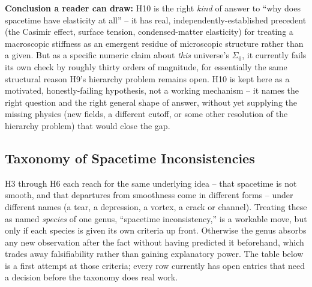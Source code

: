 \documentclass[12pt, a4paper]{article}
\begin{document}
\textbf{Conclusion a reader can draw:} H10 is the right \emph{kind} of
answer to ``why does spacetime have elasticity at all'' -- it has
real, independently-established precedent (the Casimir effect,
surface tension, condensed-matter elasticity) for treating a
macroscopic stiffness as an emergent residue of microscopic structure
rather than a given. But as a specific numeric claim about \emph{this}
universe's $\Sigma_0$, it currently fails its own check by roughly
thirty orders of magnitude, for essentially the same structural reason
H9's hierarchy problem remains open. H10 is kept here as a motivated,
honestly-failing hypothesis, not a working mechanism -- it names the
right question and the right general shape of answer, without yet
supplying the missing physics (new fields, a different cutoff, or
some other resolution of the hierarchy problem) that would close the
gap.

\subsection{Taxonomy of Spacetime Inconsistencies}
\label{subsec:taxonomy}
H3 through H6 each reach for the same underlying idea -- that
spacetime is not smooth, and that departures from smoothness come in
different forms -- under different names (a tear, a depression, a
vortex, a crack or channel). Treating these as named \emph{species} of
one genus, ``spacetime inconsistency,'' is a workable move, but only
if each species is given its own criteria up front. Otherwise the
genus absorbs any new observation after the fact without having
predicted it beforehand, which trades away falsifiability rather than
gaining explanatory power. The table below is a first attempt at
those criteria; every row currently has open entries that need a
decision before the taxonomy does real work.
\end{document}

